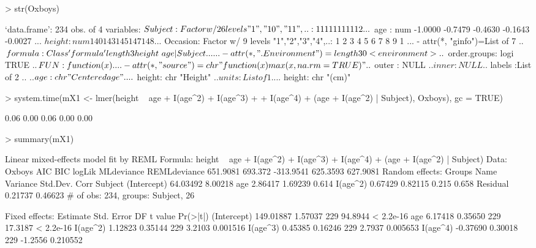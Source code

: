 \documentclass[12pt]{article}
\begin{document}
\begin{Schunk}
\begin{Sinput}
> str(Oxboys)
\end{Sinput}
\begin{Soutput}
`data.frame':	234 obs. of  4 variables:
 $ Subject : Factor w/ 26 levels "1","10","11",..: 1 1 1 1 1 1 1 1 1 12 ...
 $ age     : num  -1.0000 -0.7479 -0.4630 -0.1643 -0.0027 ...
 $ height  : num  140 143 145 147 148 ...
 $ Occasion: Factor w/ 9 levels "1","2","3","4",..: 1 2 3 4 5 6 7 8 9 1 ...
 - attr(*, "ginfo")=List of 7
  ..$ formula     :Class 'formula' length 3 height ~ age | Subject
  .. .. ..- attr(*, ".Environment")=length 30 <environment> 
  ..$ order.groups: logi TRUE
  ..$ FUN         :function (x)  
  .. ..- attr(*, "source")= chr "function (x) max(x, na.rm = TRUE)"
  ..$ outer       : NULL
  ..$ inner       : NULL
  ..$ labels      :List of 2
  .. ..$ age   : chr "Centered age"
  .. ..$ height: chr "Height"
  ..$ units       :List of 1
  .. ..$ height: chr "(cm)"
\end{Soutput}
\begin{Sinput}
> system.time(mX1 <- lmer(height ~ age + I(age^2) + I(age^3) + 
+     I(age^4) + (age + I(age^2) | Subject), Oxboys), gc = TRUE)
\end{Sinput}
\begin{Soutput}
[1] 0.06 0.00 0.06 0.00 0.00
\end{Soutput}
\begin{Sinput}
> summary(mX1)
\end{Sinput}
\begin{Soutput}
Linear mixed-effects model fit by REML
Formula: height ~ age + I(age^2) + I(age^3) + I(age^4) + (age + I(age^2) |      Subject) 
   Data: Oxboys 
      AIC     BIC    logLik MLdeviance REMLdeviance
 651.9081 693.372 -313.9541   625.3593     627.9081
Random effects:
 Groups   Name        Variance Std.Dev. Corr        
 Subject  (Intercept) 64.03492 8.00218              
          age          2.86417 1.69239  0.614       
          I(age^2)     0.67429 0.82115  0.215 0.658 
 Residual              0.21737 0.46623              
# of obs: 234, groups: Subject, 26

Fixed effects:
             Estimate Std. Error  DF t value  Pr(>|t|)
(Intercept) 149.01887    1.57037 229 94.8944 < 2.2e-16
age           6.17418    0.35650 229 17.3187 < 2.2e-16
I(age^2)      1.12823    0.35144 229  3.2103  0.001516
I(age^3)      0.45385    0.16246 229  2.7937  0.005653
I(age^4)     -0.37690    0.30018 229 -1.2556  0.210552


\end{Soutput}
\end{Schunk}
\end{document}
